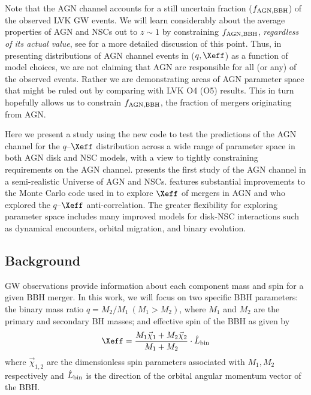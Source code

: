 Note that the AGN channel accounts for a still uncertain fraction ($f_{\rm AGN,BBH}$) of the observed LVK GW events.
We will learn considerably about the average properties of AGN and NSCs out to $z \sim 1$ by constraining $f_{\rm AGN, BBH}$, \emph{regardless of its actual value}, see \citet{FordMcKernan25} for a more detailed discussion of this point.
Thus, in presenting distributions of AGN channel events in ($q,\Xeff$) as a function of model choices, we are not claiming that AGN are responsible for all (or any) of the observed events.
Rather we are demonstrating areas of AGN parameter space that might be ruled out by comparing with LVK O4 (O5) results.
This in turn hopefully allows us to constrain $f_{\rm AGN,BBH}$, the fraction of mergers originating from AGN.

Here we present a study using the new  code \citep[Monte Carlo For AGN Channel Testing and Simulations:][hereafter Paper I]{McKernan+25-mcfactsI} to test the predictions of the AGN channel for the $q$--$\Xeff$ distribution across a wide range of parameter space in both AGN disk and NSC models, with a view to tightly constraining requirements on the AGN channel.
\citet{Delfavero+25} presents the first study of the AGN channel in a semi-realistic Universe of AGN and NSCs.
 features substantial improvements to the Monte Carlo code used in \citet{McKernan+20a} to explore $\Xeff$ of mergers in AGN and \citet{Mckernan+22:q-Xeff} who explored the $q$--$\Xeff$ anti-correlation.
The greater flexibility for exploring parameter space includes many improved models for disk-NSC interactions such as dynamical encounters, orbital migration, and binary evolution.


\subsection{Background}
\label{sec:background-ch2}
GW observations provide information about each component mass and spin for a given BBH merger.
In this work, we will focus on two specific BBH parameters: the binary mass ratio $q=M_2/M_1\ (M_1>M_2)$, where $M_{1}$ and $M_{2}$ are the primary and secondary BH masses; and effective spin of the BBH as given by 
\begin{equation}
\label{eqn:Xeff}
 \Xeff = \frac{M_{1}\vec{\chi}_{1} + M_{2} \vec{\chi}_{2}}{M_{1}+M_{2}}\cdot \hat{L}_{\rm bin}
\end{equation}
where $\vec{\chi}_{1,2}$ are the dimensionless spin parameters associated with $M_{1},M_{2}$ respectively and $\hat{L}_{\rm bin}$ is the direction of the orbital angular momentum vector of the BBH.

